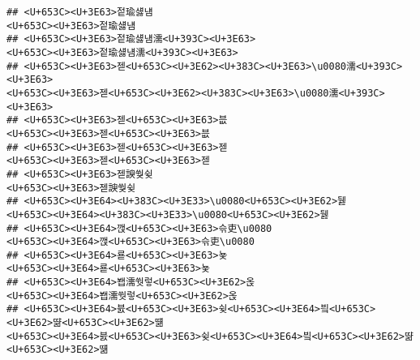 \documentclass[]{article}
\begin{document}
\begin{verbatim}
## <U+653C><U+3E63>젙瑜섏냼                                                                                                                                                                                         <U+653C><U+3E63>젙瑜섏냼
## <U+653C><U+3E63>젙瑜섏냼濡<U+393C><U+3E63>                                                                                                                                                                 <U+653C><U+3E63>젙瑜섏냼濡<U+393C><U+3E63>
## <U+653C><U+3E63>젣<U+653C><U+3E62><U+383C><U+3E63>\u0080濡<U+393C><U+3E63>                                                                                                                         <U+653C><U+3E63>젣<U+653C><U+3E62><U+383C><U+3E63>\u0080濡<U+393C><U+3E63>
## <U+653C><U+3E63>젣<U+653C><U+3E63>븞                                                                                                                                                                             <U+653C><U+3E63>젣<U+653C><U+3E63>븞
## <U+653C><U+3E63>젣<U+653C><U+3E63>젣                                                                                                                                                                             <U+653C><U+3E63>젣<U+653C><U+3E63>젣
## <U+653C><U+3E63>젣諛쒖슂                                                                                                                                                                                         <U+653C><U+3E63>젣諛쒖슂
## <U+653C><U+3E64><U+383C><U+3E33>\u0080<U+653C><U+3E62>뒗                                                                                                                                                 <U+653C><U+3E64><U+383C><U+3E33>\u0080<U+653C><U+3E62>뒗
## <U+653C><U+3E64>깭<U+653C><U+3E63>슦吏\u0080                                                                                                                                                             <U+653C><U+3E64>깭<U+653C><U+3E63>슦吏\u0080
## <U+653C><U+3E64>룓<U+653C><U+3E63>뇿                                                                                                                                                                             <U+653C><U+3E64>룓<U+653C><U+3E63>뇿
## <U+653C><U+3E64>봽濡쒓렇<U+653C><U+3E62>옩                                                                                                                                                                 <U+653C><U+3E64>봽濡쒓렇<U+653C><U+3E62>옩
## <U+653C><U+3E64>븘<U+653C><U+3E63>슂<U+653C><U+3E64>빀<U+653C><U+3E62>땲<U+653C><U+3E62>떎                                                                                                     <U+653C><U+3E64>븘<U+653C><U+3E63>슂<U+653C><U+3E64>빀<U+653C><U+3E62>땲<U+653C><U+3E62>떎

\end{verbatim}
\end{document}

